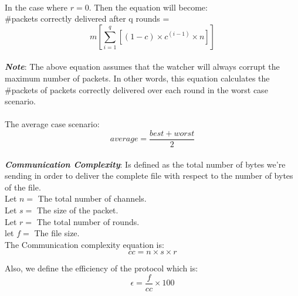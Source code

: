 \documentclass[main.tex]{subfiles}
\begin{document}
 \paragraph{}
 In the case where $r = 0$. Then the equation will become:\\
  \#packets correctly delivered after q rounds  =\begin{equation} m[ \sum_{i=1}^{q} [(1-c) \times c^{(i-1)} \times n]]\end{equation}
 \paragraph{}
\textbf{\textit{Note}}: The above equation assumes that the watcher will always corrupt the maximum number of packets. In other words, this equation calculates the \#packets of packets correctly delivered over each round in the worst case scenario.
\paragraph{}
The average case scenario:
\begin{equation} average = \frac{best + worst}{2}\end{equation}
\paragraph{}
\textbf{\textit{Communication Complexity}}: Is defined as the total number of bytes we're sending in order to deliver the complete file with respect to the number of bytes of the file. \\
Let $n = $ The total number of channels.\\
Let $s = $ The size of the packet.\\
Let $r = $ The total number of rounds.\\
let $f = $ The file size.\\

The Communication complexity equation is: \begin{equation} cc = n \times s \times r \end{equation}

Also, we define the efficiency of the protocol which is:
\begin{equation}
\epsilon = \frac{f}{cc} \times 100 
\end{equation}
\end{document}
